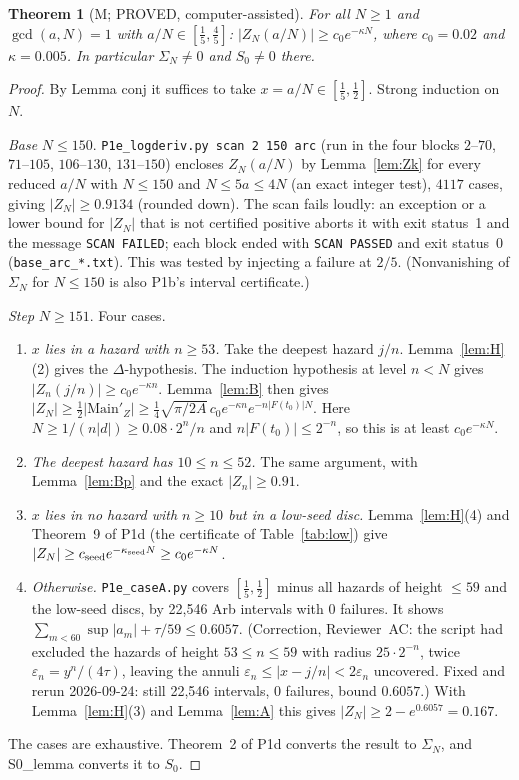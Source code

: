 \documentclass[11pt]{article}
\newtheorem{theorem}{Theorem}\newtheorem{lemma}[theorem]{Lemma}\newtheorem{proposition}[theorem]{Proposition}
\theoremstyle{definition}\newtheorem{definition}[theorem]{Definition}
\theoremstyle{remark}\newtheorem{remark}[theorem]{Remark}
\begin{document}
\begin{theorem}[M; PROVED, computer-assisted]\label{thm:M}
For all $N\ge1$ and $\gcd(a,N)=1$ with $a/N\in[\frac15,\frac45]$: $|Z_N(a/N)|\ge c_0e^{-\kappa N}$, where $c_0=0.02$ and $\kappa=0.005$. In particular $\Sigma_N\ne0$ and $S_0\ne0$ there.
\end{theorem}
\begin{proof}
By Lemma conj it suffices to take $x=a/N\in[\frac15,\frac12]$. Strong induction on $N$.

\emph{Base} $N\le150$. \texttt{P1e\_logderiv.py scan 2 150 arc} (run in the four blocks $2$--$70$, $71$--$105$, $106$--$130$, $131$--$150$) encloses $Z_N(a/N)$ by Lemma~\ref{lem:Zk} for every reduced $a/N$ with $N\le150$ and $N\le5a\le4N$ (an exact integer test), $4117$ cases, giving $|Z_N|\ge0.9134$ (rounded down). The scan fails loudly: an exception or a lower bound for $|Z_N|$ that is not certified positive aborts it with exit status~1 and the message \texttt{SCAN FAILED}; each block ended with \texttt{SCAN PASSED} and exit status~0 (\texttt{base\_arc\_*.txt}). This was tested by injecting a failure at $2/5$. (Nonvanishing of $\Sigma_N$ for $N\le150$ is also P1b's interval certificate.)

\emph{Step} $N\ge151$. Four cases.
\begin{enumerate}
\item \emph{$x$ lies in a hazard with $n\ge53$.} Take the deepest hazard $j/n$. Lemma~\ref{lem:H}(2) gives the $\Delta$-hypothesis. The induction hypothesis at level $n<N$ gives $|Z_n(j/n)|\ge c_0e^{-\kappa n}$. Lemma~\ref{lem:B} then gives $|Z_N|\ge\frac12|\mathrm{Main}'_Z|\ge\frac14\sqrt{\pi/2A}\,c_0e^{-\kappa n}e^{-n|F(t_0)|N}$.
Here $N\ge1/(n|d|)\ge0.08\cdot2^n/n$ and $n|F(t_0)|\le2^{-n}$, so this is at least $c_0e^{-\kappa N}$.
\item \emph{The deepest hazard has $10\le n\le52$.} The same argument, with Lemma~\ref{lem:Bp} and the exact $|Z_n|\ge0.91$.
\item \emph{$x$ lies in no hazard with $n\ge10$ but in a low-seed disc.} Lemma~\ref{lem:H}(4) and Theorem~9 of P1d (the certificate of Table~\ref{tab:low}) give $|Z_N|\ge c_{\rm seed}e^{-\kappa_{\rm seed}N}\ge c_0e^{-\kappa N}$.
\item \emph{Otherwise.} \texttt{P1e\_caseA.py} covers $[\frac15,\frac12]$ minus all hazards of height $\le59$ and the low-seed discs, by 22,546 Arb intervals with 0 failures. It shows $\sum_{m<60}\sup|a_m|+\tau/59\le0.6057$. (Correction, Reviewer~AC: the script had excluded the hazards of height $53\le n\le59$ with radius $25\cdot2^{-n}$, twice $\varepsilon_n=y^n/(4\tau)$, leaving the annuli $\varepsilon_n\le|x-j/n|<2\varepsilon_n$ uncovered. Fixed and rerun 2026-09-24: still 22,546 intervals, 0 failures, bound $0.6057$.) With Lemma~\ref{lem:H}(3) and Lemma~\ref{lem:A} this gives $|Z_N|\ge2-e^{0.6057}=0.167$.
\end{enumerate}
The cases are exhaustive. Theorem~2 of P1d converts the result to $\Sigma_N$, and S0\_lemma converts it to $S_0$.
\end{proof}
\end{document}
